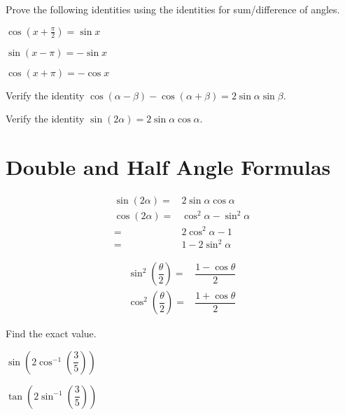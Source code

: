 \newpage

\begin{exercise}
  Prove the following identities using the identities for sum/difference of angles.
  \begin{enumerate*}
    \item $\cos(x+\frac{\pi}{2})=\sin x$
    \item $\sin(x-\pi)=-\sin x$
    \item $\cos(x+\pi)=-\cos x$\hfill\null
  \end{enumerate*}
\end{exercise}

\begin{exercise}
  Verify the identity $\cos(\alpha-\beta)-\cos(\alpha+\beta)=2\sin \alpha \sin \beta$.
\end{exercise}

\begin{exercise}
  Verify the identity $\sin(2\alpha)=2\sin \alpha \cos \alpha$.
\end{exercise}


\newpage

\section{Double and Half Angle Formulas}

\begin{corollary}
  \begin{align*}
    \sin(2\alpha)=&2\sin\alpha\cos\alpha\\
    \cos(2\alpha)=&\cos^2\alpha-\sin^2\alpha\\
    =&2\cos^2\alpha -1\\
    =&1-2\sin^2\alpha
  \end{align*}
\end{corollary}

\begin{corollary}
  \begin{align*}
    \sin^2\left(\dfrac{\theta}{2}\right)=&\dfrac{1-\cos\theta}{2}\\
    \cos^2\left(\dfrac{\theta}{2}\right)=&\dfrac{1+\cos\theta}{2}
  \end{align*}
\end{corollary}

\begin{example}
  Find the exact value.\\
  \begin{enumerate*}
    \item $\sin\left(2\cos^{-1}\left(\dfrac{3}{5}\right)\right)$
    \item $\tan\left(2\sin^{-1}\left(\dfrac{3}{5}\right)\right)$\hfill\null
  \end{enumerate*}
\end{example}

